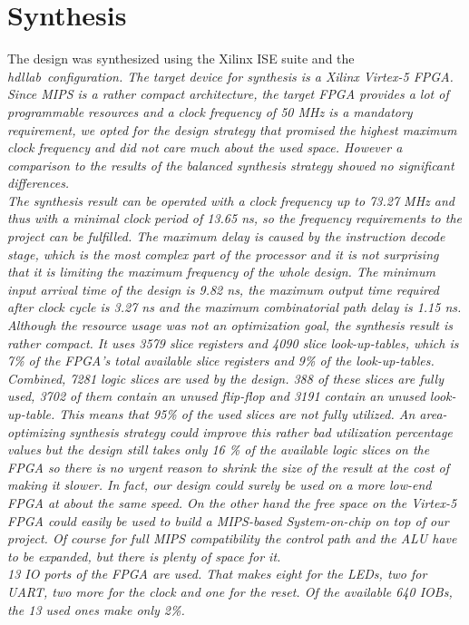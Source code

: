 \chapter{Synthesis}
The design was synthesized using the Xilinx ISE suite and the \em hdllab\em \ configuration. The target device for synthesis is a Xilinx Virtex-5 FPGA. Since MIPS is a rather compact architecture, the target FPGA provides a lot of programmable resources and a clock frequency of 50 MHz is a mandatory requirement, we opted for the design strategy that promised the highest maximum clock frequency and did not care much about the used space. However a comparison to the results of the balanced synthesis strategy showed no significant differences.\\
The synthesis result can be operated with a clock frequency up to 73.27 MHz and thus with a minimal clock period of 13.65 ns, so the frequency requirements to the project can be fulfilled. The maximum delay is caused by the instruction decode stage, which is the most complex part of the processor and it is not surprising that it is limiting the maximum frequency of the whole design. The minimum input arrival time of the design is 9.82 ns, the maximum output time required after clock cycle is 3.27 ns and the maximum combinatorial path delay is 1.15 ns.\\
Although the resource usage was not an optimization goal, the synthesis result is rather compact. It uses 3579 slice registers and 4090 slice look-up-tables, which is 7\% of the FPGA's total available slice registers and 9\% of the look-up-tables. Combined, 7281 logic slices are used by the design. 388 of these slices are fully used, 3702 of them contain an unused flip-flop and 3191 contain an unused look-up-table. This means that 95\% of the used slices are not fully utilized. An area-optimizing synthesis strategy could improve this rather bad utilization percentage values but the design still takes only 16 \% of the available logic slices on the FPGA so there is no urgent reason to shrink the size of the result at the cost of making it slower. In fact, our design could surely be used on a more low-end FPGA at about the same speed. On the other hand the free space on the Virtex-5 FPGA could easily be used to build a MIPS-based System-on-chip on top of our project. Of course for full MIPS compatibility the control path and the ALU have to be expanded, but there is plenty of space for it.\\
13 IO ports of the FPGA are used. That makes eight for the LEDs, two for UART, two more for the clock and one for the reset. Of the available 640 IOBs, the 13 used ones make only 2\%.\\
